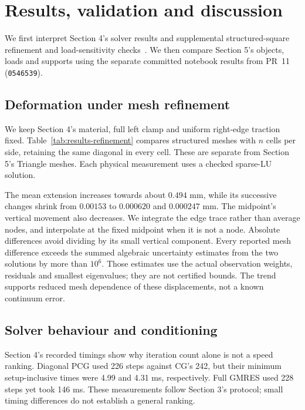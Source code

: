\section{Results, validation and discussion}
\label{sec:results-validation}

We first interpret Section 4's solver results and supplemental structured-square
refinement and load-sensitivity checks~\cite{nla-square-code}. We then compare
Section 5's objects, loads and supports using the separate committed
notebook results from PR~11 (\texttt{0546539}).

\subsection{Deformation under mesh refinement}
We keep Section 4's material, full left clamp and uniform right-edge
traction fixed. Table~\ref{tab:results-refinement} compares structured
meshes with $n$ cells per side, retaining the same diagonal in every
cell. These are separate from Section 5's Triangle meshes.
Each physical measurement uses a checked sparse-LU solution.

\begin{table}[htbp]
 \centering
 \caption{Supplemental structured-square refinement results from
 \texttt{generate\_evidence.py}. Here $\bar u_x$ is the right-edge
 horizontal displacement averaged by edge length; $u_x^m,u_y^m$ are
 the components at the fixed midpoint $(1,0.5)$ m. Displacements are
 in mm. $\kappa_2(A)$ is estimated from checked extreme eigenpairs.}
 \label{tab:results-refinement}
 
\end{table}

The mean extension increases towards about $0.494$ mm, while its
successive changes shrink from $0.00153$ to $0.000620$ and $0.000247$ mm.
The midpoint's vertical movement also decreases. We integrate the edge
trace rather than average nodes, and interpolate at the fixed midpoint
when it is not a node. Absolute differences avoid dividing by its small
vertical component. Every reported mesh difference exceeds the summed
algebraic uncertainty estimates from the two solutions by more than
$10^6$. Those estimates use the actual observation weights, residuals and
smallest eigenvalues; they are not certified bounds. The trend supports
reduced mesh dependence of these displacements, not a known continuum error.

\subsection{Solver behaviour and conditioning}
Section 4's recorded timings show why iteration count alone is not a
speed ranking. Diagonal PCG used 226 steps against CG's 242, but their
minimum setup-inclusive times were 4.99 and 4.31 ms, respectively.
Full GMRES used 228 steps yet took 146 ms. These measurements follow Section 3's protocol; small timing
differences do not establish a general ranking.

